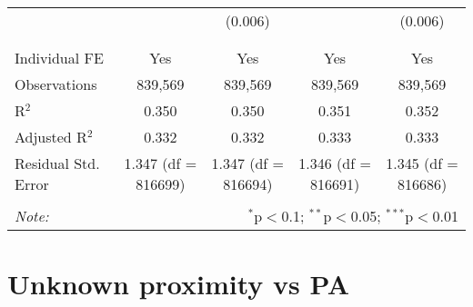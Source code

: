 \documentclass[
]{article}
\begin{document}
\begin{table}[!htbp]
{\begin{tabular}{@{\extracolsep{5pt}}lcccc}
  &  & (0.006) &  & (0.006) \\ 
  & & & & \\ 
\hline \\[-1.8ex] 
Individual FE & Yes & Yes & Yes & Yes \\ 
Observations & 839,569 & 839,569 & 839,569 & 839,569 \\ 
R$^{2}$ & 0.350 & 0.350 & 0.351 & 0.352 \\ 
Adjusted R$^{2}$ & 0.332 & 0.332 & 0.333 & 0.333 \\ 
Residual Std. Error & 1.347 (df = 816699) & 1.347 (df = 816694) & 1.346 (df = 816691) & 1.345 (df = 816686) \\ 
\hline 
\hline \\[-1.8ex] 
\textit{Note:}  & \multicolumn{4}{r}{$^{*}$p$<$0.1; $^{**}$p$<$0.05; $^{***}$p$<$0.01} \\ 
\end{tabular}
} 
\end{table} 
\newpage
\section{Unknown proximity vs PA}
\end{document}

